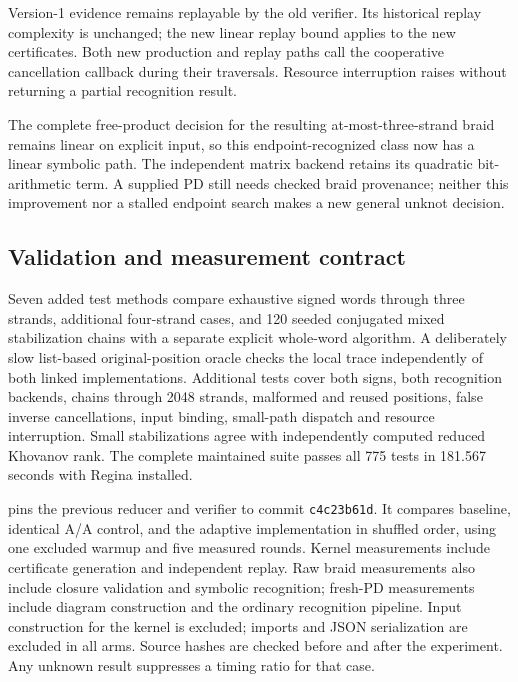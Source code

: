 Version-1 evidence remains replayable by the old verifier. Its historical
replay complexity is unchanged; the new linear replay bound applies to the
new certificates. Both new production and replay paths call the cooperative
cancellation callback during their traversals. Resource interruption raises
without returning a partial recognition result.

The complete free-product decision for the resulting at-most-three-strand
braid remains linear on explicit input, so this endpoint-recognized class
now has a linear symbolic path. The independent matrix backend retains its
quadratic bit-arithmetic term. A supplied PD still needs checked braid
provenance; neither this improvement nor a stalled endpoint search makes a
new general unknot decision.

\subsection{Validation and measurement contract}

Seven added test methods compare exhaustive signed words through three
strands, additional four-strand cases, and 120
seeded conjugated mixed stabilization chains with a separate explicit
whole-word algorithm. A deliberately slow list-based original-position
oracle checks the local trace independently of both linked implementations.
Additional tests cover both signs, both recognition backends, chains through
2048 strands, malformed and reused positions, false inverse cancellations,
input binding, small-path dispatch and resource interruption. Small
stabilizations agree with independently computed reduced Khovanov rank.
The complete maintained suite passes all 775 tests in 181.567 seconds with
Regina installed.

 pins the previous reducer and verifier
to commit \texttt{c4c23b61d}. It compares baseline, identical A/A control,
and the adaptive implementation in shuffled order, using one excluded
warmup and five measured rounds. Kernel measurements include certificate
generation and independent replay. Raw braid measurements also include
closure validation and symbolic recognition; fresh-PD measurements include
diagram construction and the ordinary recognition pipeline. Input construction
for the kernel is excluded; imports and JSON serialization are excluded in
all arms. Source hashes are checked before and after the experiment. Any
unknown result suppresses a timing ratio for that case.

